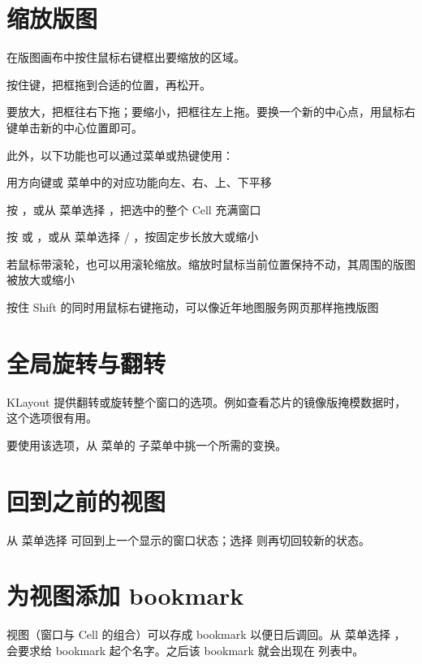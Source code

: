 \section{缩放版图}\label{sec:zoom}

在版图画布中按住鼠标右键框出要缩放的区域。

按住键，把框拖到合适的位置，再松开。

要放大，把框往右下拖；要缩小，把框往左上拖。要换一个新的中心点，用鼠标右键单击新的中心位置即可。

此外，以下功能也可以通过菜单或热键使用：

\begin{kldesc}
\item 用方向键或  菜单中的对应功能向左、右、上、下平移
\item 按 ，或从  菜单选择 ，把选中的整个 Cell 充满窗口
\item 按  或 ，或从  菜单选择  / ，按固定步长放大或缩小
\item 若鼠标带滚轮，也可以用滚轮缩放。缩放时鼠标当前位置保持不动，其周围的版图被放大或缩小
\item 按住 Shift 的同时用鼠标右键拖动，可以像近年地图服务网页那样拖拽版图
\end{kldesc}

\section{全局旋转与翻转}\label{sec:global_trans}

KLayout 提供翻转或旋转整个窗口的选项。例如查看芯片的镜像版掩模数据时，这个选项很有用。

要使用该选项，从  菜单的  子菜单中挑一个所需的变换。

\section{回到之前的视图}\label{sec:view_state}

从  菜单选择  可回到上一个显示的窗口状态；选择  则再切回较新的状态。

\section{为视图添加 bookmark}\label{sec:bookmarks}

视图（窗口与 Cell 的组合）可以存成 bookmark 以便日后调回。从  菜单选择 ，会要求给 bookmark 起个名字。之后该 bookmark 就会出现在  列表中。

